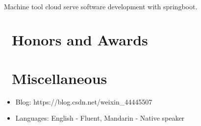 \documentclass{resume}
\begin{document}
\\ Machine tool cloud serve software development with springboot.

\section{\faHeartO\ Honors and Awards}

\section{\faInfo\ Miscellaneous}
\begin{itemize}[parsep=0.5ex]
  \item Blog: https://blog.csdn.net/weixin\_44445507
  \item Languages: English - Fluent, Mandarin - Native speaker
\end{itemize}

%
%
\end{document}
